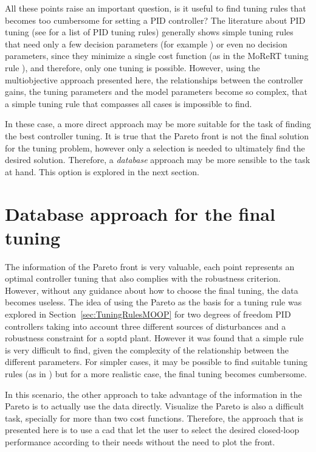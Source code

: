 All these points raise an important question, is it useful to find tuning rules that becomes too cumbersome for setting a PID controller? The literature about PID tuning (see \citet{ODwyer2000} for a list of PID tuning rules) generally shows simple tuning rules that need only a few decision parameters (for example \citet{Skogestad2003}) or even no decision parameters, since they minimize a single cost function (as in the MoReRT tuning rule \citep{Alfaro2016}), and therefore, only one tuning is possible. However, using the multiobjective approach presented here, the relationships between the controller gains, the tuning parameters and the model parameters become so complex, that a simple tuning rule that compasses all cases is impossible to find.

In these case, a more direct approach may be more suitable for the task of finding the best controller tuning. It is true that the Pareto front is not the final solution for the tuning problem, however only a selection is needed to ultimately find the desired solution. Therefore, a \textit{database} approach may be more sensible to the task at hand. This option is explored in the next section.
%
\section{Database approach for the final tuning}
\label{sec:DatabaseMOOP}
%
The information of the Pareto front is very valuable, each point represents an optimal controller tuning that also complies with the robustness criterion. However, without any guidance about how to choose the final tuning, the data becomes useless. The idea of using the Pareto as the basis for a tuning rule was explored in Section~\ref{sec:TuningRulesMOOP} for two degrees of freedom PID controllers taking into account three different sources of disturbances and a robustness constraint for a \gls{soptd} plant. However it was found that a simple rule is very difficult to find, given the complexity of the relationship between the different parameters. For simpler cases, it may be possible to find suitable tuning rules (as in \citet{ContrerasLeiva2015a}) but for a more realistic case, the final tuning becomes cumbersome.

In this scenario, the other approach to take advantage of the information in the Pareto is to actually use the data directly. Visualize the Pareto is also a difficult task, specially for more than two cost functions. Therefore, the approach that is presented here is to use a \gls{cad} that let the user to select the desired closed-loop performance according to their needs without the need to plot the front.

